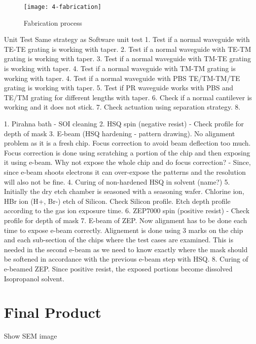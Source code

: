 \documentclass[../report.tex]{subfiles}
\begin{document}
\begin{figure}[H] %
	\centering
	\texttt{[image: 4-fabrication]}
	\caption{Fabrication process}
	\label{fig:4_fabrication}
\end{figure} 

Unit Test
Same strategy as Software unit test
1. Test if a normal waveguide with TE-TE grating is working with taper.
2. Test if a normal waveguide with TE-TM grating is working with taper.
3. Test if a normal waveguide with TM-TE grating is working with taper.
4. Test if a normal waveguide with TM-TM grating is working with taper.
4. Test if a normal waveguide with PBS TE/TM-TM/TE grating is working with taper.
5. Test if PR waveguide works with PBS and TE/TM grating for different lengths with taper.
6. Check if a normal cantilever is working and it does not stick.
7. Check actuation using separation strategy.
8. 

1. Pirahna bath - SOI cleaning
2. HSQ spin (negative resist) - Check profile for depth of mask
3. E-beam (HSQ hardening - pattern drawing). No alignment problem as it is a fresh chip. Focus correction to avoid beam deflection too much. Focus correction is done using scratching a portion of the chip and then exposing it using e-beam. Why not expose the whole chip and do focus correction? - Since, since e-beam shoots electrons it can over-expose the patterns and the resolution will also not be fine.
4. Curing of non-hardened HSQ in solvent (name?)
5. Initially the dry etch chamber is seasoned with a seasoning wafer. Chlorine ion, HBr ion (H+, Br-) etch of Silicon. Check Silicon profile. Etch depth profile according to the gas ion exposure time.
6. ZEP7000 spin (positive resist) - Check profile for depth of mask
7. E-beam of ZEP. Now alignment has to be done each time to expose e-beam correctly. Alignement is done using 3 marks on the chip and each sub-section of the chips where the test cases are examined. This is needed in the second e-beam as we need to know exactly where the mask should be softened in accordance with the previous e-beam step with HSQ.
8. Curing of e-beamed ZEP. Since positive resist, the exposed portions become dissolved Isopropanol solvent.





\section{Final Product}

Show SEM image
\end{document}
